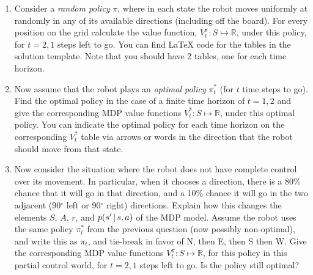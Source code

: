 \documentclass[submit]{harvardml}
\begin{document}
\begin{problem}
\begin{enumerate}
    \item Consider a \emph{random policy} $\pi$, where in each state the robot
        moves uniformly at randomly in any of its available directions
        (including off the board).  For every position on the grid calculate
        the value function, $V^\pi_t: S\mapsto \mathbb{R}$, under this policy,
        for $t=2, 1$ steps left to go.  You can find LaTeX code for the tables
        in the solution template. Note that you should have 2 tables, one for
        each time horizon.

    \item Now assume that the robot plays an \emph{optimal policy} $\pi^\ast_t$
        (for $t$ time steps to go). Find the optimal policy in the case of a
        finite time horizon of $t = 1, 2$ and give the corresponding MDP value
        functions $V^\ast_t: S\mapsto \mathbb{R}$, under this optimal policy.
        You can indicate the optimal policy for each time horizon on the
        corresponding $V^\ast_t$ table via arrows or words in the direction
        that the robot should move from that state.

    \item Now consider the situation where the robot does not have complete
        control over its movement. In particular, when it chooses a direction,
        there is a 80\% chance that it will go in that direction, and a 10\%
        chance it will go in the two adjacent (90$^\circ$ left or 90$^\circ$
        right) directions. Explain how this changes the elements $S$, $A$, $r$,
        and $p(s' \,|\, s,a)$ of the MDP model.  Assume the robot uses the
        same policy $\pi^\ast_t$ from the previous question (now possibly
        non-optimal), and write this as $\pi_t$, and tie-break in favor of N,
        then E, then S then W.  Give the corresponding MDP value functions
        $V^\pi_t: S\mapsto \mathbb{R}$, for this policy in this partial control
        world, for $t=2, 1$ steps left to go. Is the policy still optimal?
  \end{enumerate}
\end{problem}
\end{document}
